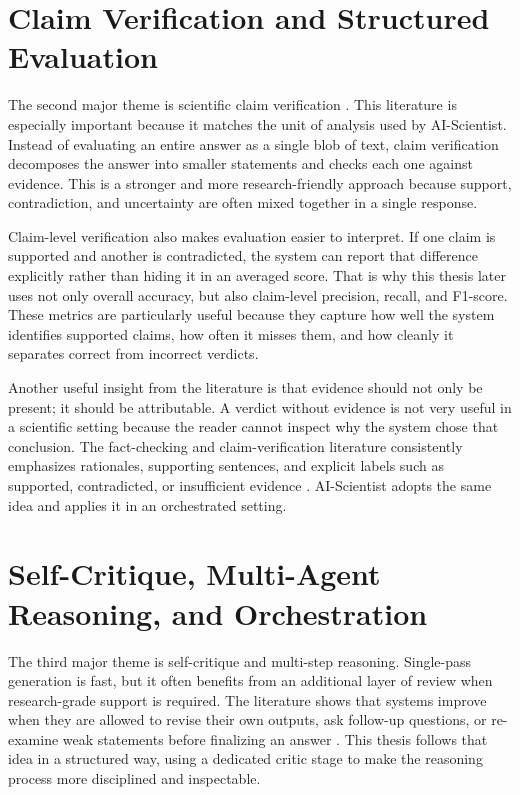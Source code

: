 \section{Claim Verification and Structured Evaluation}

The second major theme is scientific claim verification \cite{thorne2018fever,wadden2020scifact,honovich2022true}. This literature is especially important because it matches the unit of analysis used by AI-Scientist. Instead of evaluating an entire answer as a single blob of text, claim verification decomposes the answer into smaller statements and checks each one against evidence. This is a stronger and more research-friendly approach because support, contradiction, and uncertainty are often mixed together in a single response.

Claim-level verification also makes evaluation easier to interpret. If one claim is supported and another is contradicted, the system can report that difference explicitly rather than hiding it in an averaged score. That is why this thesis later uses not only overall accuracy, but also claim-level precision, recall, and F1-score. These metrics are particularly useful because they capture how well the system identifies supported claims, how often it misses them, and how cleanly it separates correct from incorrect verdicts.

Another useful insight from the literature is that evidence should not only be present; it should be attributable. A verdict without evidence is not very useful in a scientific setting because the reader cannot inspect why the system chose that conclusion. The fact-checking and claim-verification literature consistently emphasizes rationales, supporting sentences, and explicit labels such as supported, contradicted, or insufficient evidence \cite{wadden2020scifact,thorne2018fever,min2023factscore}. AI-Scientist adopts the same idea and applies it in an orchestrated setting.

\section{Self-Critique, Multi-Agent Reasoning, and Orchestration}

The third major theme is self-critique and multi-step reasoning. Single-pass generation is fast, but it often benefits from an additional layer of review when research-grade support is required. The literature shows that systems improve when they are allowed to revise their own outputs, ask follow-up questions, or re-examine weak statements before finalizing an answer \cite{shinn2023reflexion,asai2024selfrag,yao2023treeofthoughts}. This thesis follows that idea in a structured way, using a dedicated critic stage to make the reasoning process more disciplined and inspectable.

